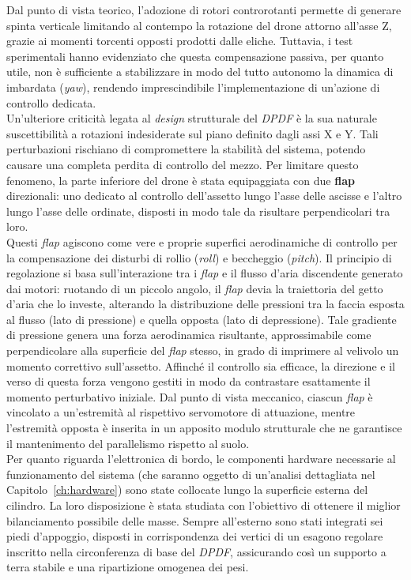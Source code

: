 \documentclass[11pt]{report}
\begin{document}
	Dal punto di vista teorico, l'adozione di rotori controrotanti permette di generare spinta verticale limitando al contempo la rotazione del drone attorno all'asse Z, grazie ai momenti torcenti opposti prodotti dalle eliche. Tuttavia, i test sperimentali hanno evidenziato che questa compensazione passiva, per quanto utile, non è sufficiente a stabilizzare in modo del tutto autonomo la dinamica di imbardata (\textit{yaw}), rendendo imprescindibile l'implementazione di un'azione di controllo dedicata.\\
	Un'ulteriore criticità legata al \textit{design} strutturale del \textit{DPDF} è la sua naturale suscettibilità a rotazioni indesiderate sul piano definito dagli assi X e Y. Tali perturbazioni rischiano di compromettere la stabilità del sistema, potendo causare una completa perdita di controllo del mezzo. Per limitare questo fenomeno, la parte inferiore del drone è stata equipaggiata con due \textbf{flap} direzionali: uno dedicato al controllo dell'assetto lungo l'asse delle ascisse e l'altro lungo l'asse delle ordinate, disposti in modo tale da risultare perpendicolari tra loro.\\
	Questi \textit{flap} agiscono come vere e proprie superfici aerodinamiche di controllo per la compensazione dei disturbi di rollio (\textit{roll}) e beccheggio (\textit{pitch}). Il principio di regolazione si basa sull'interazione tra i \textit{flap} e il flusso d'aria discendente generato dai motori: ruotando di un piccolo angolo, il \textit{flap} devia la traiettoria del getto d'aria che lo investe, alterando la distribuzione delle pressioni tra la faccia esposta al flusso (lato di pressione) e quella opposta (lato di depressione). Tale gradiente di pressione genera una forza aerodinamica risultante, approssimabile come perpendicolare alla superficie del \textit{flap} stesso, in grado di imprimere al velivolo un momento correttivo sull'assetto. Affinché il controllo sia efficace, la direzione e il verso di questa forza vengono gestiti in modo da contrastare esattamente il momento perturbativo iniziale. Dal punto di vista meccanico, ciascun \textit{flap} è vincolato a un'estremità al rispettivo servomotore di attuazione, mentre l'estremità opposta è inserita in un apposito modulo strutturale che ne garantisce il mantenimento del parallelismo rispetto al suolo.\\
	Per quanto riguarda l'elettronica di bordo, le componenti hardware necessarie al funzionamento del sistema (che saranno oggetto di un'analisi dettagliata nel Capitolo~\ref{ch:hardware}) sono state collocate lungo la superficie esterna del cilindro. La loro disposizione è stata studiata con l'obiettivo di ottenere il miglior bilanciamento possibile delle masse. Sempre all'esterno sono stati integrati sei piedi d'appoggio, disposti in corrispondenza dei vertici di un esagono regolare inscritto nella circonferenza di base del \textit{DPDF}, assicurando così un supporto a terra stabile e una ripartizione omogenea dei pesi.\\
\end{document}
